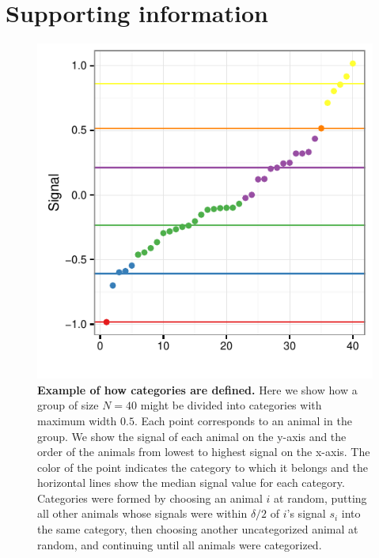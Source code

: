 \newpage



\clearpage{}
\renewcommand{\thesection}{}
\section{Supporting information}
\renewcommand{\thesection}{S}
\renewcommand{\thesubsection}{S\arabic{subsection}}
\renewcommand{\theequation}{S\arabic{equation}}
\renewcommand{\thetable}{S\arabic{table}}
\renewcommand{\thefigure}{S\arabic{figure}}
\setcounter{equation}{0}  
\setcounter{figure}{0}
\setcounter{table}{0}

\begin{figure}[ht]
\includegraphics[width=.8\textwidth]{figures/categories.pdf}
\caption{\sffamily\small\textbf{Example of how categories are defined.}
Here we show how a group of size $N=40$ might be divided into categories with maximum width $0.5$. Each point corresponds to an animal in the group. We show the signal of each animal on the y-axis and the order of the animals from lowest to highest signal on the x-axis. The color of the point indicates the category to which it belongs and the horizontal lines show the median signal value for each category. Categories were formed by choosing an animal $i$ at random, putting all other animals whose signals were within $\delta/2$ of $i$'s signal $s_i$ into the same category, then choosing another uncategorized animal at random, and continuing until all animals were categorized.}
 \label{cats_ex}
\end{figure}

